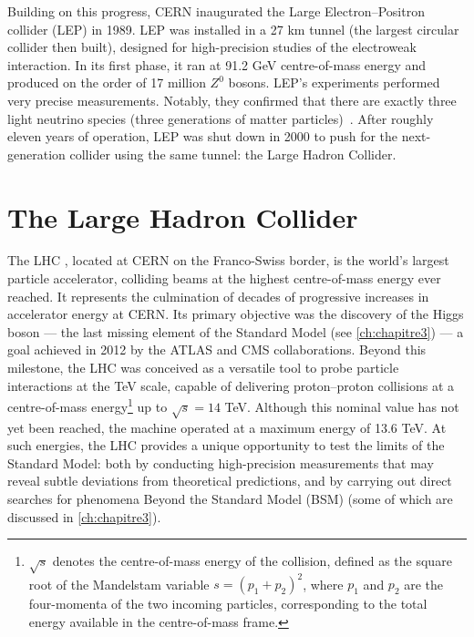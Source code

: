 \vspace{0.5 cm}

Building on this progress, CERN inaugurated the Large Electron–Positron collider (LEP) in 1989. LEP was installed in a 27 km tunnel (the largest circular collider then built), designed for high-precision studies of the electroweak interaction. In its first phase, it ran at 91.2 GeV centre-of-mass energy and produced on the order of 17 million $Z^0$ bosons. LEP's experiments performed very precise measurements. Notably, they confirmed that there are exactly three light neutrino species (three generations of matter particles)~\cite{LEPEW2006}. After roughly eleven years of operation, LEP was shut down in 2000 to push for the next-generation collider using the same tunnel: the Large Hadron Collider.


\section{The Large Hadron Collider}
\label{sec:LHC}

The LHC \cite{EvansBryant2008}, located at CERN on the Franco-Swiss border, is the world's largest particle accelerator, colliding beams at the highest centre-of-mass energy ever reached. It represents the culmination of decades of progressive increases in accelerator energy at CERN. Its primary objective was the discovery of the Higgs boson --- the last missing element of the Standard Model (see \cref{ch:chapitre3}) --- a goal achieved in 2012 by the ATLAS \cite{ATLAS_Higgs} and CMS \cite{CMS_Higgs} collaborations. Beyond this milestone, the LHC was conceived as a versatile tool to probe particle interactions at the TeV scale, capable of delivering proton--proton collisions at a centre-of-mass energy\footnote{$\sqrt{s}$ denotes the centre-of-mass energy of the collision, defined as the square root of the Mandelstam variable $s=(p_1+p_2)^2$, where $p_1$ and $p_2$ are the four-momenta of the two incoming particles, corresponding to the total energy available in the centre-of-mass frame.} up to $\sqrt{s}=14$ TeV. Although this nominal value has not yet been reached, the machine operated at a maximum energy of 13.6 TeV. At such energies, the LHC provides a unique opportunity to test the limits of the Standard Model: both by conducting high-precision measurements that may reveal subtle deviations from theoretical predictions, and by carrying out direct searches for phenomena Beyond the Standard Model (BSM) (some of which are discussed in \cref{ch:chapitre3}).

